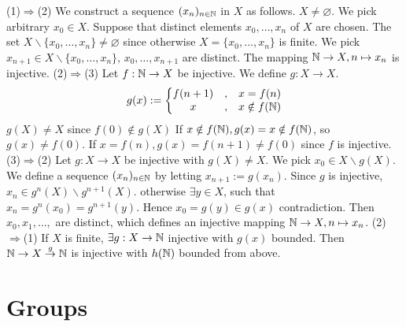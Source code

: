 \documentclass{book}
\numberwithin{equation}{section}
\begin{document}
\begin{proofenv}
    \quad
    \newline
    (1)$\Rightarrow$(2) We construct a sequence $(x_n)_{n\in \mathbb{N}}$ in $X$ as follows. $X\not=\varnothing$. We pick arbitrary $x_0\in X$. Suppose that distinct elements $x_0,\dots, x_n$ of $X$ are chosen. The set $X\backslash\{x_0,\dots,x_n\}\not=\varnothing$ since otherwise $X=\{x_0,\dots,x_n\}$ is finite. We pick $x_{n+1}\in X\backslash\{x_0,\dots,x_n\},\, x_0,\dots,x_{n+1}$ are distinct. The mapping $\mathbb{N}\rightarrow X, n\mapsto x_n$ is injective.
    \newline
    (2)$\Rightarrow$(3) Let $f:\mathbb{N}\rightarrow X$ be injective. We define $g:X\rightarrow X$.
    $$g(x):=
\left\{\begin{matrix}
 f(n+1)&, &x=f(n) \\
x&,&x\notin f(\mathbb{N})
\end{matrix}\right.$$
$g(X)\not=X$ since $f(0)\notin g(X)$ If $x\notin f(\mathbb{N}),g(x)=x\notin f(\mathbb{N})$, so $g(x)\not=f(0)$. If $x=f(n), g(x)=f(n+1)\not=f(0)$ since $f$ is injective.
\newline
(3)$\Rightarrow$(2) Let $g:X\rightarrow X$ be injective with $g(X)\not=X$. We pick $x_0\in X\backslash g(X)$. We define a sequence $(x_n)_{n\in\mathbb{N}}$ by letting $x_{n+1}:=g(x_n)$. Since $g$ is injective, $x_n\in g^n(X)\backslash g^{n+1}(X)$. otherwise $\exists y\in X$, such that $x_n=g^{n}(x_0)=g^{n+1}(y)$. Hence $x_0=g(y)\in g(x)$ contradiction. Then $x_0,x_1,\dots,$ are distinct, which defines an injective mapping $\mathbb{N}\rightarrow X,n\mapsto x_n$.
\newline
(2)$\Rightarrow$(1) If $X$ is finite, $\exists g:X\rightarrow\mathbb{N}$ injective with $g(x)$ bounded. Then $\mathbb{N}\rightarrow X\overset{g}{\rightarrow}\mathbb{N}$ is injective with $h(\mathbb{N})$ bounded from above.
\end{proofenv}

\chapter{Groups}
\end{document}

